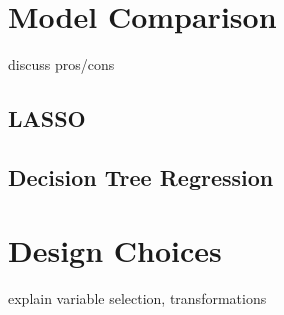\documentclass[12pt]{article}
\begin{document}
\section{Model Comparison} %
\label{sec:model_comparison}

discuss pros/cons

\subsection{LASSO} %
\label{sub:lasso}


\subsection{Decision Tree Regression} %
\label{sub:decision_tree_regression}



\section{Design Choices} %
\label{sec:design_choices}

explain variable selection, transformations

\end{document}
